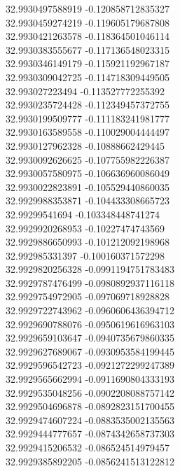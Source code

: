 {32.9930497588919	-0.120858712835327\\
32.9930459274219	-0.119605179687808\\
32.9930421263578	-0.118364501046114\\
32.9930383555677	-0.117136548023315\\
32.9930346149179	-0.115921192967187\\
32.9930309042725	-0.114718309449505\\
32.993027223494	-0.113527772255392\\
32.9930235724428	-0.112349457372755\\
32.9930199509777	-0.111183241981777\\
32.9930163589558	-0.110029004444497\\
32.9930127962328	-0.10888662429445\\
32.9930092626625	-0.107755982226387\\
32.9930057580975	-0.106636960086049\\
32.9930022823891	-0.105529440860035\\
32.9929988353871	-0.104433308665723\\
32.99299541694	-0.103348448741274\\
32.9929920268953	-0.10227474743569\\
32.9929886650993	-0.101212092198968\\
32.992985331397	-0.100160371572298\\
32.9929820256328	-0.0991194751783483\\
32.9929787476499	-0.0980892937116118\\
32.9929754972905	-0.097069718928828\\
32.9929722743962	-0.0960606436394712\\
32.9929690788076	-0.0950619616963103\\
32.9929659103647	-0.0940735679860335\\
32.9929627689067	-0.0930953584199445\\
32.9929596542723	-0.0921272299247389\\
32.9929565662994	-0.0911690804333193\\
32.9929535048256	-0.0902208088757142\\
32.9929504696878	-0.0892823151700455\\
32.9929474607224	-0.0883535002135563\\
32.9929444777657	-0.0874342658737303\\
32.9929415206532	-0.086524514979457\\
32.9929385892205	-0.0856241513122812\\
}
